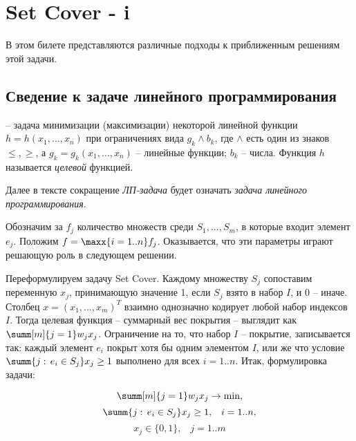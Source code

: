 \hypertarget{setcover}{\section{Set Cover - i}}


В этом билете представляются различные подходы к приближенным решениям этой задачи. 

\subsection{Сведение к задаче линейного программирования}

 -- задача минимизации (максимизации) некоторой линейной функции $h = h(x_1, ..., x_n)$ при ограничениях вида $g_k \land b_k$, где $\land$ есть один из знаков $\leq, \geq$, а $g_k = g_k(x_1, ..., x_n)$ -- линейные функции; $b_k$ -- числа. Функция $h$ называется \textit{целевой} функцией.

Далее в тексте сокращение \textit{ЛП-задача} будет означать \textit{задача линейного программирования}.

Обозначим за $f_j$ количество множеств среди $S_1, ..., S_m$, в которые входит элемент $e_j$. Положим $f = \maxx{i=1..n} f_j$. Оказывается, что эти параметры играют решающую роль в следующем решении.

Переформулируем задачу Set Cover. Каждому множеству $S_j$ сопоставим переменную $x_j$, принимающую значение 1, если $S_j$ взято в набор $I$, и 0 -- иначе. Столбец $x = (x_1, ..., x_m)^T$ взаимно однозначно кодирует любой набор индексов $I$. Тогда целевая функция -- суммарный вес покрытия -- выглядит как $\summ[m]{j=1} w_j x_j$. Ограничение на то, что набор $I$ -- покрытие, записывается так: каждый элемент $e_i$ покрыт хотя бы одним элементом $I$, или же что условие $\summ{j:\, e_i \in S_j} x_j \geq 1$ выполнено для всех $i=1..n$. Итак, формулировка задачи:

$$\summ[m]{j=1} w_j x_j \rightarrow \min,$$
$$\summ{j:\, e_i \in S_j} x_j \geq 1, \;\;\; i=1..n,$$
$$x_j \in \{0, 1\}, \;\;\; j=1..m$$


